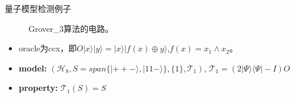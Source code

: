 \documentclass[aspectratio=1610]{ctexbeamer}
\begin{document}

\begin{frame}{量子模型检测例子}
    \begin{figure}[h]
        \centering
        \label{fig:cir}
        \caption{Grover\_3算法的电路。}
    \end{figure}
    \begin{itemize}
        \item oracle为ccx，即$O|x\rangle|y\rangle = |x\rangle|f(x)\oplus y\rangle $,$f(x)=x_1\wedge x_2$。
        \item \textbf{model:} $(\mathcal{H}_8, S = span\{|++-\rangle,|11-\rangle\}, \{1\}, {\mathcal{T}_1})$, $\mathcal{T}_1 =(2|\Psi\rangle\langle \Psi| - I)O$ 
        \item \textbf{property:} $\mathcal{T}_1(S)=S$
    \end{itemize}
\end{frame}
\end{document}
